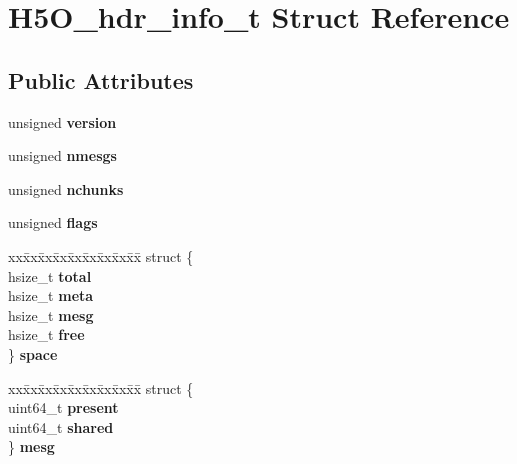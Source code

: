 \hypertarget{struct_h5_o__hdr__info__t}{}\section{H5\+O\+\_\+hdr\+\_\+info\+\_\+t Struct Reference}
\label{struct_h5_o__hdr__info__t}
\subsection*{Public Attributes}
\begin{DoxyCompactItemize}
\item 
\mbox{\label{struct_h5_o__hdr__info__t_a9790e41fb3d82a088206201ac4b8609f}} 
unsigned {\bfseries version}
\item 
\mbox{\label{struct_h5_o__hdr__info__t_acdd6ba66d56c7b42ec2b06e23a690885}} 
unsigned {\bfseries nmesgs}
\item 
\mbox{\label{struct_h5_o__hdr__info__t_aae81f350de2b4d9ea333d0cf9cc69ef2}} 
unsigned {\bfseries nchunks}
\item 
\mbox{\label{struct_h5_o__hdr__info__t_a781cac5a9a1dee769de6ce396c079cfb}} 
unsigned {\bfseries flags}
\item 
\mbox{\label{struct_h5_o__hdr__info__t_a16e1d54c6147893c7c849a8f3d7d8b20}} 
\begin{tabbing}
xx\=xx\=xx\=xx\=xx\=xx\=xx\=xx\=xx\=\kill
struct \{\\
\>hsize\_t {\bfseries total}\\
\>hsize\_t {\bfseries meta}\\
\>hsize\_t {\bfseries mesg}\\
\>hsize\_t {\bfseries free}\\
\} {\bfseries space}\\

\end{tabbing}\item 
\mbox{\label{struct_h5_o__hdr__info__t_a63ac640021fbd151c827a808d2d631c7}} 
\begin{tabbing}
xx\=xx\=xx\=xx\=xx\=xx\=xx\=xx\=xx\=\kill
struct \{\\
\>uint64\_t {\bfseries present}\\
\>uint64\_t {\bfseries shared}\\
\} {\bfseries mesg}\\


\end{tabbing}
\end{DoxyCompactItemize}
